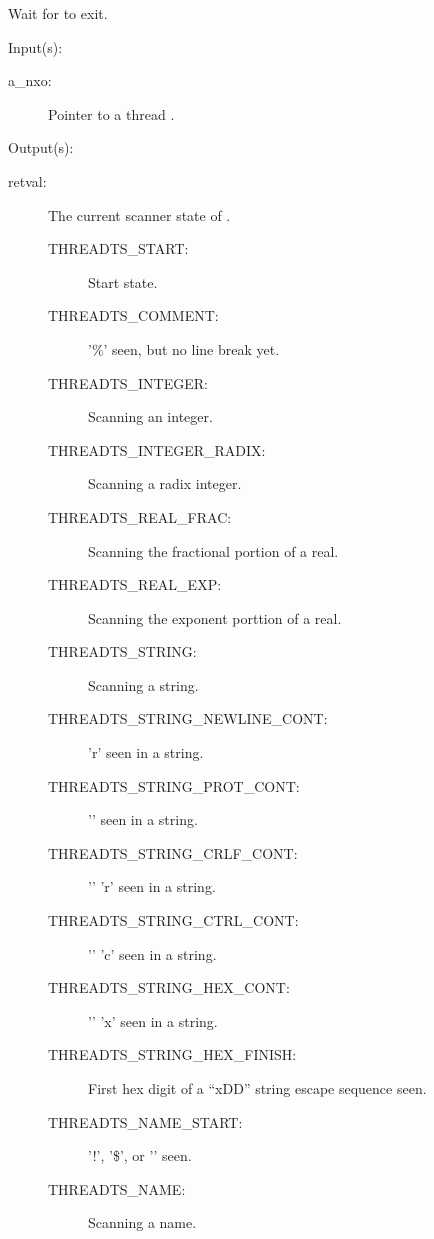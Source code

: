 \begin{capi}
\begin{capilist}
		Wait for  to exit.
	\end{capilist}
\label{nxo_thread_state}
	\begin{capilist}
	\item[Input(s): ]
		\begin{description}\item[]
		\item[a\_nxo: ]
			Pointer to a thread .
		\end{description}
	\item[Output(s): ]
		\begin{description}\item[]
		\item[retval: ] The current scanner state of .
			\begin{description}\item[]
			\item[THREADTS\_START: ] Start state.
			\item[THREADTS\_COMMENT: ] '\%' seen, but no line break
				yet.
			\item[THREADTS\_INTEGER: ] Scanning an integer.
			\item[THREADTS\_INTEGER\_RADIX: ] Scanning a radix
				integer.
			\item[THREADTS\_REAL\_FRAC: ] Scanning the fractional
				portion of a real.
			\item[THREADTS\_REAL\_EXP: ] Scanning the exponent
				porttion of a real.
			\item[THREADTS\_STRING: ] Scanning a string.
			\item[THREADTS\_STRING\_NEWLINE\_CONT: ] '{\bs}r' seen
				in a string.
			\item[THREADTS\_STRING\_PROT\_CONT: ] '{\bs}{\bs}' seen
				in a string.
			\item[THREADTS\_STRING\_CRLF\_CONT: ] '{\bs}' '{\bs}r'
				seen in a string.
			\item[THREADTS\_STRING\_CTRL\_CONT: ] '{\bs}' 'c' seen
				in a string.
			\item[THREADTS\_STRING\_HEX\_CONT: ] '{\bs}' 'x' seen in
				a string.
			\item[THREADTS\_STRING\_HEX\_FINISH: ] First hex digit
				of a ``{\bs}xDD'' string escape sequence seen.
			\item[THREADTS\_NAME\_START: ] '!', '\$', or '{\twid}'
				seen.
			\item[THREADTS\_NAME: ] Scanning a name.

\end{description}
\end{description}
\end{capilist}
\end{capi}
